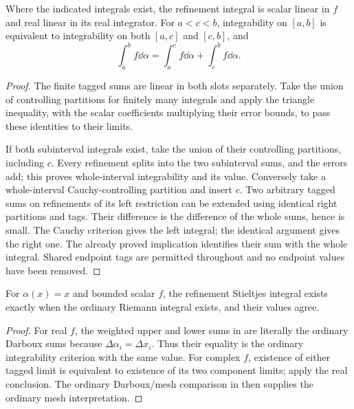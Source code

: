 \begin{theorem}
Where the indicated integrals exist, the refinement integral is scalar linear in $f$ and real linear in its real integrator. For $a<c<b$, integrability on $[a,b]$ is equivalent to integrability on both $[a,c]$ and $[c,b]$, and
\[\int_a^b f\dd\alpha=\int_a^c f\dd\alpha+\int_c^b f\dd\alpha.\]
\end{theorem}
\begin{proof}
The finite tagged sums are linear in both slots separately. Take the union of controlling partitions for finitely many integrals and apply the triangle inequality, with the scalar coefficients multiplying their error bounds, to pass these identities to their limits.

If both subinterval integrals exist, take the union of their controlling partitions, including $c$. Every refinement splits into the two subinterval sums, and the errors add; this proves whole-interval integrability and its value. Conversely take a whole-interval Cauchy-controlling partition and insert $c$. Two arbitrary tagged sums on refinements of its left restriction can be extended using identical right partitions and tags. Their difference is the difference of the whole sums, hence is small. The Cauchy criterion gives the left integral; the identical argument gives the right one. The already proved implication identifies their sum with the whole integral. Shared endpoint tags are permitted throughout and no endpoint values have been removed.
\end{proof}

\begin{theorem}
For $\alpha(x)=x$ and bounded scalar $f$, the refinement Stieltjes integral exists exactly when the ordinary Riemann integral exists, and their values agree.
\end{theorem}
\begin{proof}
For real $f$, the weighted upper and lower sums in  are literally the ordinary Darboux sums because $\Delta\alpha_i=\Delta x_i$. Thus their equality is the ordinary integrability criterion with the same value. For complex $f$, existence of either tagged limit is equivalent to existence of its two component limits; apply the real conclusion. The ordinary Darboux/mesh comparison in  then supplies the ordinary mesh interpretation.
\end{proof}

